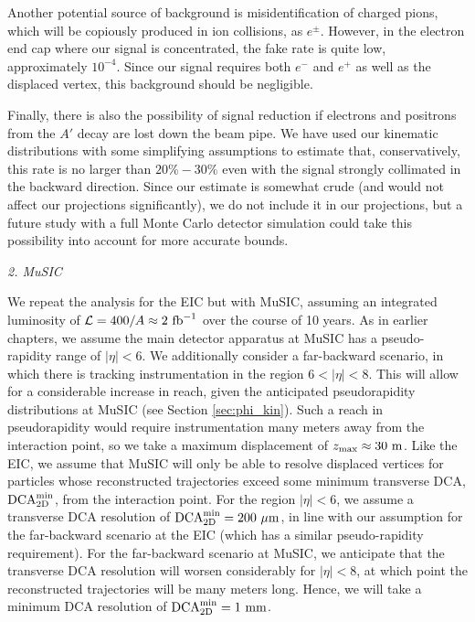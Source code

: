 Another potential source of background is misidentification of charged pions, which will be copiously produced in ion collisions, as $e^\pm$. However, in the electron end cap where our signal is concentrated, the fake rate is quite low, approximately $10^{-4}$. Since our signal requires both $e^-$ and $e^+$ as well as the displaced vertex, this background should be negligible. 

Finally, there is also the possibility of signal reduction if electrons and positrons from the $A'$ decay are lost down the beam pipe. We have used our kinematic distributions with some simplifying assumptions to estimate that, conservatively, this rate is no larger than $20\%-30\%$ even with the signal strongly collimated in the backward direction. Since our estimate is somewhat crude (and would not affect our projections significantly), we do not include it in our projections, but a future study with a full Monte Carlo detector simulation could take this possibility into account for more accurate bounds. 

\begin{center}
    {\it 2. MuSIC}
\end{center}

We repeat the analysis for the EIC but with MuSIC, assuming an integrated luminosity of ${\cal L} = 400/A \approx 2~{\rm fb}^{-1}$ over the course of 10 years. As in earlier chapters, we assume the main detector apparatus at MuSIC has a pseudo-rapidity range of $|\eta | < 6$. We additionally consider a far-backward scenario, in which there is tracking instrumentation in the region $6 < |\eta| < 8$. This will allow for a considerable increase in reach, given the anticipated pseudorapidity distributions at MuSIC (see Section \ref{sec:phi_kin}). Such a reach in pseudorapidity would require instrumentation many meters away from the interaction point, so we take a maximum displacement of $z_{\rm max} \approx 30~{\rm m}$. Like the EIC, we assume that MuSIC will only be able to resolve displaced vertices for particles whose reconstructed trajectories exceed some minimum transverse DCA, ${\rm DCA}_{\rm 2D}^{\rm min}$, from the interaction point. For the region $|\eta| < 6$, we assume a transverse DCA resolution of ${\rm DCA}_{\rm 2D}^{\rm min} = 200~{\mu \rm m}$, in line with our assumption for the far-backward scenario at the EIC (which has a similar pseudo-rapidity requirement). For the far-backward scenario at MuSIC, we anticipate that the transverse DCA resolution will worsen considerably for $|\eta| < 8$, at which point the reconstructed trajectories will be many meters long. Hence, we will take a minimum DCA resolution of ${\rm DCA}_{\rm 2D}^{\rm min} = 1~{\rm mm}$.

